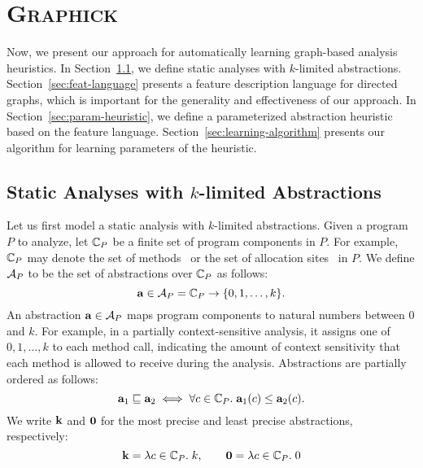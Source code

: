 

\section{\textsc{Graphick}}\label{sec:approach}

Now, we present our approach for automatically learning graph-based analysis heuristics.
In Section~\ref{sec:setting}, we define static analyses with $k$-limited abstractions.
Section~\ref{sec:feat-language} presents a feature description language for directed graphs, which is important for the generality and effectiveness of our approach.
In Section~\ref{sec:param-heuristic}, we define a parameterized abstraction heuristic based on the feature language.
Section~\ref{sec:learning-algorithm} presents our algorithm for learning parameters of the heuristic.

\subsection{Static Analyses with $k$-limited Abstractions}\label{sec:setting}

Let us first model a static analysis with $k$-limited abstractions.
Given a program $P$ to analyze, let $\mathbb{C}_P$ be a finite set of program components in $P$.
For example, $\mathbb{C}_P$ may denote the set of methods~\cite{JeJeChOh17} or the set of allocation sites~\cite{Tan2017} in $P$.
We define $\mathcal{A}_P$ to be the set of abstractions over $\mathbb{C}_P$ as follows:
\[
{\bf a} \in \mathcal{A}_P = \mathbb{C}_P \to  \{0,1,\dots,k\}.
\]
An abstraction ${\bf a} \in \mathcal{A}_P$ maps program components to natural numbers between $0$ and $k$.
For example, in a partially context-sensitive analysis, it assigns one of $0,1,\dots, k$ to each method call,
indicating the amount of context sensitivity that each method is allowed to receive during the analysis.
Abstractions are partially ordered as follows:
\[
{\bf a}_1 \sqsubseteq {\bf a}_2 \iff \forall c \in \mathbb{C}_P.\; {\bf a}_1(c) \le {\bf a}_2(c).
\]
We write ${\bf k}$ and ${\bf 0}$ for the most precise and least precise abstractions, respectively:
\[
{\bf k} = \lambda c \in \mathbb{C}_P.\; k, \qquad
{\bf 0} = \lambda c \in \mathbb{C}_P.\; 0
\]

